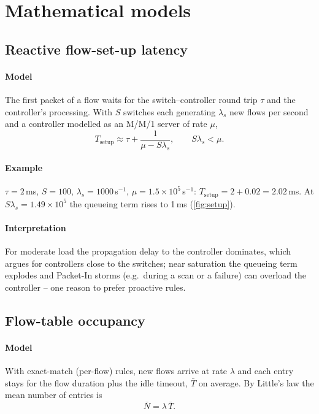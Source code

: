\documentclass[11pt,a4paper]{article}
\begin{document}
\section{Mathematical models}

\subsection{Reactive flow-set-up latency}\label{sec:setup}
\paragraph{Model} The first packet of a flow waits for the switch--controller round trip $\tau$ and the
controller's processing. With $S$ switches each generating $\lambda_s$ new flows per second and a controller
modelled as an M/M/1 server of rate $\mu$,
\begin{equation}\label{eq:setup}
  T_{\mathrm{setup}} \approx \tau + \frac{1}{\mu - S\lambda_s}, \qquad S\lambda_s < \mu .
\end{equation}
\paragraph{Example} $\tau = 2$\,ms, $S = 100$, $\lambda_s = 1000$\,s$^{-1}$, $\mu = 1.5\times10^5$\,s$^{-1}$:
$T_{\mathrm{setup}} = 2 + 0.02 = 2.02$\,ms. At $S\lambda_s = 1.49\times10^5$ the queueing term rises to 1\,ms
(\cref{fig:setup}).
\paragraph{Interpretation} For moderate load the propagation delay to the controller dominates, which argues for
controllers close to the switches; near saturation the queueing term explodes and Packet-In storms (e.g.\ during
a scan or a failure) can overload the controller -- one reason to prefer proactive rules.

\begin{acnfigure}
  \caption{Controller queueing delay versus Packet-In rate (\cref{eq:setup}).}
  \label{fig:setup}
\end{acnfigure}

\subsection{Flow-table occupancy}\label{sec:little}
\paragraph{Model} With exact-match (per-flow) rules, new flows arrive at rate $\lambda$ and each entry stays
for the flow duration plus the idle timeout, $\bar T$ on average. By Little's law the mean number of entries is
\begin{equation}\label{eq:little}
  \bar N = \lambda\,\bar T .
\end{equation}
\end{document}
